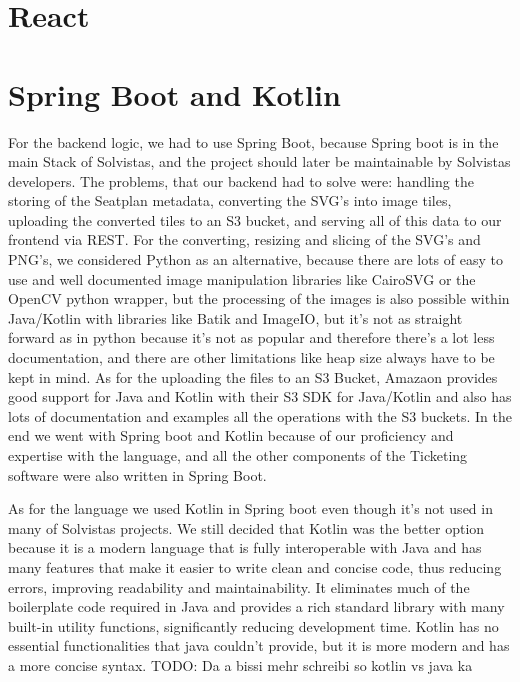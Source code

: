 \section{React}

\section{Spring Boot and Kotlin}
For the backend logic, we had to use Spring Boot, because Spring boot is in the main Stack of Solvistas, and the project should later be maintainable by Solvistas developers. The problems, that our backend had to solve were: handling the storing of the Seatplan metadata, converting the SVG's into image tiles, uploading the converted tiles to an S3 bucket, and serving all of this data to our frontend via REST. For the converting, resizing and slicing of the SVG's and PNG's, we considered Python as an alternative, because there are lots of easy to use and well documented image manipulation libraries like CairoSVG or the OpenCV python wrapper, but the processing of the images is also possible within Java/Kotlin with libraries like Batik and ImageIO, but it's not as straight forward as in python because it's not as popular and therefore there's a lot less documentation, and there are other limitations like heap size always have to be kept in mind. As for the uploading the files to an S3 Bucket, Amazaon provides good support for Java and Kotlin with their S3 SDK for Java/Kotlin and also has lots of documentation and examples all the operations with the S3 buckets. In the end we went with Spring boot and Kotlin because of our proficiency and expertise with the language, and all the other components of the Ticketing software were also written in Spring Boot.

As for the language we used Kotlin in Spring boot even though it's not used in many of Solvistas projects. We still decided that Kotlin was the better option because it is a modern language that is fully interoperable with Java and has many features that make it easier to write clean and concise code, thus reducing errors, improving readability and maintainability. It eliminates much of the boilerplate code required in Java and provides a rich standard library with many built-in utility functions, significantly reducing development time. Kotlin has no essential functionalities that java couldn't provide, but it is more modern and has a more concise syntax. TODO: Da a bissi mehr schreibi so kotlin vs java ka

